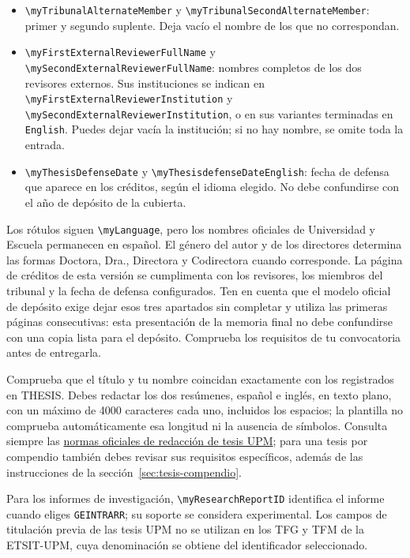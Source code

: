 \begin{itemize}
  \item \texttt{\textbackslash{}myTribunalAlternateMember} y \texttt{\textbackslash{}myTribunalSecondAlternateMember}: primer y segundo suplente. Deja vacío el nombre de los que no correspondan.
  \item \texttt{\textbackslash{}myFirstExternalReviewerFullName} y \texttt{\textbackslash{}mySecondExternalReviewerFullName}: nombres completos de los dos revisores externos. Sus instituciones se indican en \texttt{\textbackslash{}myFirstExternalReviewerInstitution} y \texttt{\textbackslash{}mySecondExternalReviewerInstitution}, o en sus variantes terminadas en \texttt{English}. Puedes dejar vacía la institución; si no hay nombre, se omite toda la entrada.
  \item \texttt{\textbackslash{}myThesisDefenseDate} y \texttt{\textbackslash{}myThesisdefenseDateEnglish}: fecha de defensa que aparece en los créditos, según el idioma elegido. No debe confundirse con el año de depósito de la cubierta.
\end{itemize}

Los rótulos siguen \texttt{\textbackslash{}myLanguage}, pero los nombres oficiales de Universidad y Escuela permanecen en español. El género del autor y de los directores determina las formas Doctora, Dra., Directora y Codirectora cuando corresponde. La página de créditos de esta versión se cumplimenta con los revisores, los miembros del tribunal y la fecha de defensa configurados. Ten en cuenta que el modelo oficial de depósito exige dejar esos tres apartados sin completar y utiliza las primeras páginas consecutivas: esta presentación de la memoria final no debe confundirse con una copia lista para el depósito. Comprueba los requisitos de tu convocatoria antes de entregarla.

Comprueba que el título y tu nombre coincidan exactamente con los registrados en THESIS. Debes redactar los dos resúmenes, español e inglés, en texto plano, con un máximo de 4000 caracteres cada uno, incluidos los espacios; la plantilla no comprueba automáticamente esa longitud ni la ausencia de símbolos. Consulta siempre las \href{https://www.upm.es/Estudiantes/Estudios_Titulaciones/Estudios_Doctorado/Tesis/NormasRedaccionTesis}{normas oficiales de redacción de tesis UPM}; para una tesis por compendio también debes revisar sus requisitos específicos, además de las instrucciones de la sección~\ref{sec:tesis-compendio}.

Para los informes de investigación, \texttt{\textbackslash{}myResearchReportID} identifica el informe cuando eliges \texttt{GEINTRARR}; su soporte se considera experimental. Los campos de titulación previa de las tesis UPM no se utilizan en los TFG y TFM de la ETSIT-UPM, cuya denominación se obtiene del identificador seleccionado.

